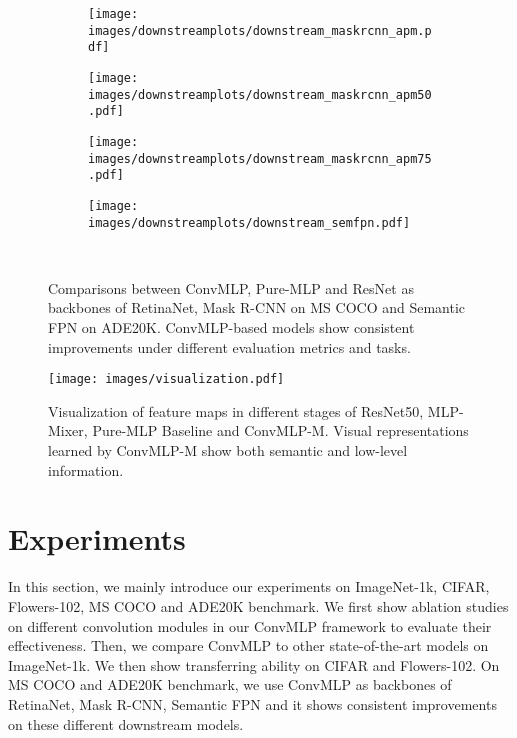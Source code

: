 \documentclass[final]{cvpr}
\begin{document}
\begin{figure*}[htpb!]
\begin{subfigure}[b]{0.245\textwidth}
         \centering
         \texttt{[image: images/downstreamplots/downstream\_maskrcnn\_apm.pdf]}
     \end{subfigure}
     \hfill
     \begin{subfigure}[b]{0.245\textwidth}
         \centering
         \texttt{[image: images/downstreamplots/downstream\_maskrcnn\_apm50.pdf]}
     \end{subfigure}
     \hfill
     \begin{subfigure}[b]{0.245\textwidth}
         \centering
         \texttt{[image: images/downstreamplots/downstream\_maskrcnn\_apm75.pdf]}
     \end{subfigure}
     \hfill
     \begin{subfigure}[b]{0.245\textwidth}
         \centering
         \texttt{[image: images/downstreamplots/downstream\_semfpn.pdf]}
     \end{subfigure}\\
    \caption{Comparisons between ConvMLP, Pure-MLP and ResNet as backbones of RetinaNet, Mask R-CNN on MS COCO and Semantic FPN on ADE20K. ConvMLP-based models show consistent improvements under different evaluation metrics and tasks.}
    \label{fig:downstream}
\end{figure*} 


\begin{figure*}[htb]
\centering
\texttt{[image: images/visualization.pdf]}
\caption{Visualization of feature maps in different stages of ResNet50, MLP-Mixer, Pure-MLP Baseline and ConvMLP-M. Visual representations learned by ConvMLP-M show both semantic and low-level information.}
\label{fig:visualization}
\end{figure*}


\section{Experiments}
In this section, we mainly introduce our experiments on ImageNet-1k, CIFAR, Flowers-102, MS COCO and ADE20K benchmark. We first show ablation studies on different convolution modules in our ConvMLP framework to evaluate their effectiveness. Then, we compare ConvMLP to other state-of-the-art models on ImageNet-1k. We then show transferring ability on CIFAR and Flowers-102. On MS COCO and ADE20K benchmark, we use ConvMLP as backbones of RetinaNet, Mask R-CNN, Semantic FPN and it shows consistent improvements on these different downstream models.
\end{document}
